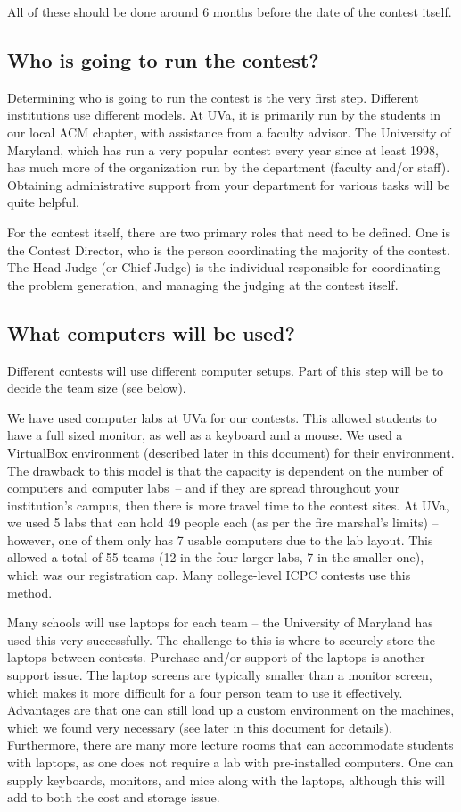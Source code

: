\documentclass[11pt,twoside,letterpaper]{book}
\begin{document}
All of these should be done around 6 months before the date of the
contest itself.


\subsection*{Who is going to run the contest?}

Determining who is going to run the contest is the very first step.
Different institutions use different models.  At UVa, it is primarily
run by the students in our local ACM chapter, with assistance from a
faculty advisor.  The University of Maryland, which has run a very
popular contest every year since at least 1998, has much more of the
organization run by the department (faculty and/or staff).  Obtaining
administrative support from your department for various tasks will be
quite helpful.

For the contest itself, there are two primary roles that need to be
defined.  One is the Contest Director, who is the person coordinating
the majority of the contest.  The Head Judge (or Chief Judge) is the
individual responsible for coordinating the problem generation, and
managing the judging at the contest itself.


\subsection*{What computers will be used?}

Different contests will use different computer setups.  Part of this
step will be to decide the team size (see below).

We have used computer labs at UVa for our contests.  This allowed
students to have a full sized monitor, as well as a keyboard and a
mouse.  We used a VirtualBox environment (described later in this
document) for their environment.  The drawback to this model is that
the capacity is dependent on the number of computers and computer
labs~-- and if they are spread throughout your institution's campus,
then there is more travel time to the contest sites.  At UVa, we used
5 labs that can hold 49 people each (as per the fire marshal's limits)
-- however, one of them only has 7 usable computers due to the lab
layout.  This allowed a total of 55 teams (12 in the four larger labs,
7 in the smaller one), which was our registration cap.  Many
college-level ICPC contests use this method.

Many schools will use laptops for each team -- the University of
Maryland has used this very successfully.  The challenge to this is
where to securely store the laptops between contests.  Purchase and/or
support of the laptops is another support issue.  The laptop screens
are typically smaller than a monitor screen, which makes it more
difficult for a four person team to use it effectively.  Advantages
are that one can still load up a custom environment on the machines,
which we found very necessary (see later in this document for
details).  Furthermore, there are many more lecture rooms that can
accommodate students with laptops, as one does not require a lab with
pre-installed computers.  One can supply keyboards, monitors, and mice
along with the laptops, although this will add to both the cost and
storage issue.
\end{document}
